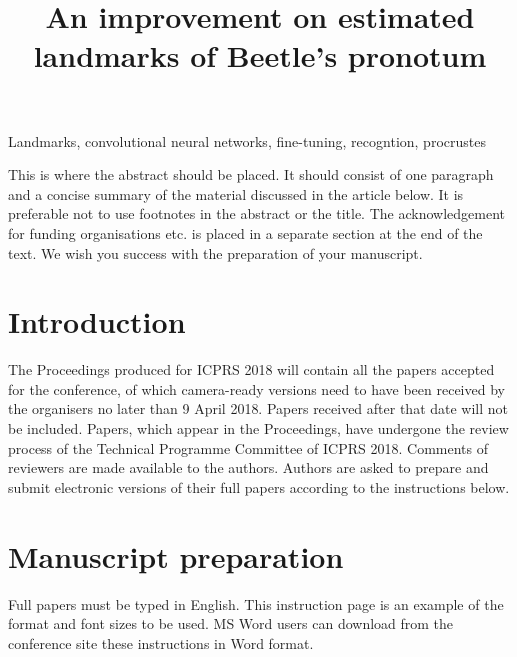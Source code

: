 \documentclass[10pt]{article}
\begin{document}
\noindent



\title{An improvement on estimated landmarks of Beetle's pronotum}




\maketitle

\keywords
Landmarks, convolutional neural networks, fine-tuning, recogntion, procrustes

\abstract
This is where the abstract should be placed. It should consist
of one paragraph and a concise summary of the material
discussed in the article below. It is preferable not to use
footnotes in the abstract or the title. The acknowledgement
for funding organisations etc. is placed in a separate section at
the end of the text. We wish you success with the preparation
of your manuscript.

\section{Introduction}
The Proceedings produced for ICPRS 2018 will contain all the
papers accepted for the conference, of which camera-ready versions
need to have been received
by the organisers no later than 9 April 2018. Papers
received after that date will not be included. Papers, which
appear in the Proceedings, have undergone the review process
of the Technical Programme Committee of ICPRS 2018.
Comments of reviewers are made available to the authors. Authors are
asked to prepare and submit electronic versions of their full
papers according to the instructions below.

\section{Manuscript preparation}
Full papers must be typed in English. This instruction page is
an example of the format and font sizes to be used. MS Word
users can download from the conference site these
instructions in Word format.
\end{document}
